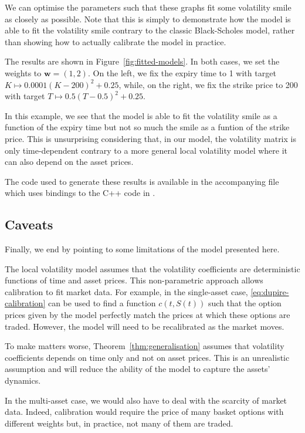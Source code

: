 \documentclass[english]{article}
\numberwithin{equation}{section}
\numberwithin{figure}{section}
\theoremstyle{bolddescit}
\theoremstyle{definition}
\theoremstyle{definition}
\theoremstyle{plain}
\theoremstyle{plain}
\theoremstyle{bolddesc}
\theoremstyle{plain}
\theoremstyle{remark}
\begin{document}
We can optimise the parameters such that these graphs fit some volatility smile as closely as possible. Note that this is simply to demonstrate how the model is able to fit the volatility smile contrary to the classic Black-Scholes model, rather than showing how to actually calibrate the model in practice.

The results are shown in Figure~\ref{fig:fitted-models}. In both cases, we set the weights to $\mathbf{w} = (1,2)$. On the left, we fix the expiry time to 1 with target $K \mapsto 0.0001 (K - 200)^2 + 0.25$, while, on the right, we fix the strike price to 200 with target $T \mapsto 0.5 (T - 0.5)^2 + 0.25$.

In this example, we see that the model is able to fit the volatility smile as a function of the expiry time but not so much the smile as a funtion of the strike price. This is unsurprising considering that, in our model, the volatility matrix is only time-dependent contrary to a more general local volatility model where it can also depend on the asset prices.

The code used to generate these results is available in the accompanying file  which uses bindings to the C++ code in .

\subsection{Caveats}

Finally, we end by pointing to some limitations of the model presented here.

The local volatility model assumes that the volatility coefficients are deterministic functions of time and asset prices. This non-parametric approach allows calibration to fit market data. For example, in the single-asset case, \eqref{eq:dupire-calibration} can be used to find a function $c(t,S(t))$ such that the option prices given by the model perfectly match the prices at which these options are traded. However, the model will need to be recalibrated as the market moves.

To make matters worse, Theorem~\ref{thm:generalisation} assumes that volatility coefficients depends on time only and not on asset prices. This is an unrealistic assumption and will reduce the ability of the model to capture the assets' dynamics.

In the multi-asset case, we would also have to deal with the scarcity of market data. Indeed, calibration would require the price of many basket options with different weights but, in practice, not many of them are traded.
\end{document}
